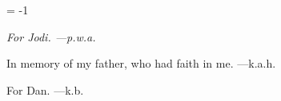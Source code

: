 %




\pageno = -1


% 
{}

\noheadlinetrue\pagebreak


% 
\blankpage

\blankpage


{ }
\noheadlinetrue


% 
\sinkage
{\it \flushright
   For Jodi.
   ---{\sc p.w.a.}
   
   In memory of my father,
   who had faith in me.
   ---{\sc k.a.h.}
   
   For Dan.
   ---{\sc k.b.}
}
\pagebreak



\blankpage
{ }

% 
% 
\rewritetocfilefalse
%
\blankpage
{}

\shortcontents


\ifcompletebook \global\rewritetocfiletrue \fi


\contents

\blankpage
{ }

\byebye
